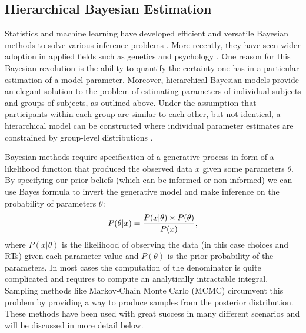 \documentclass[letterpaper,10pt,english]{article}
\begin{document}
\subsection*{Hierarchical Bayesian Estimation}
\label{methods:hierarchical-bayesian-estimation}
Statistics and machine learning have developed efficient and versatile Bayesian methods to solve various inference problems \citep{Poirier06}. More recently, they have seen wider adoption in applied fields such as genetics \citep{StephensBalding09} and psychology \citep{ClemensDeSelenEtAl11}. One reason for this Bayesian revolution is the ability to quantify the certainty one has in a particular estimation of a model parameter. Moreover, hierarchical Bayesian models provide an elegant solution to the problem of estimating parameters of individual subjects and groups of subjects, as outlined above. Under the assumption that participants within each group are similar to each other, but not identical, a hierarchical model can be constructed where individual parameter estimates are constrained by group-level distributions \citep{NilssonRieskampWagenmakers11,ShiffrinLeeKim08}.

Bayesian methods require specification of a generative process in form
of a likelihood function that produced the observed data $x$
given some parameters $\theta$. By specifying our prior beliefs
(which can be informed or non-informed) we can use Bayes formula to
invert the generative model and make inference on the probability of
parameters $\theta$:
\label{methods:bayes}\begin{gather}
\begin{split}P(\theta|x) = \frac{P(x|\theta) \times P(\theta)}{P(x)}\end{split}\notag,
\end{gather}
where $P(x|\theta)$ is the likelihood of observing the data (in
this case choices and RTs) given each parameter value and
$P(\theta)$ is the prior probability of the parameters. In most
cases the computation of the denominator is quite complicated and
requires to compute an analytically intractable integral. Sampling
methods like Markov-Chain Monte Carlo (MCMC) \citep{GamermanLopes06}
circumvent this problem by providing a way to produce samples from the
posterior distribution. These methods have been used with great
success in many different scenarios \citep{GelmanCarlinSternEtAl03}
and will be discussed in more detail below.
\end{document}
